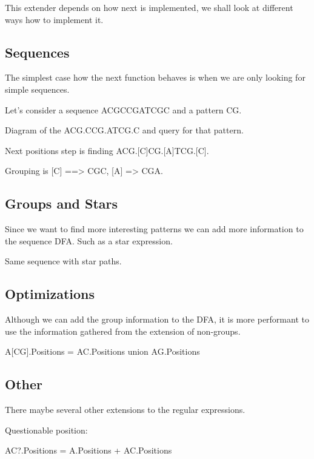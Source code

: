 This extender depends on how next is implemented, we shall look at different
ways how to implement it.

\subsection{Sequences}

The simplest case how the next function behaves is when we are only looking for simple sequences.

Let's consider a sequence ACGCCGATCGC and a pattern CG.

Diagram of the ACG.CCG.ATCG.C and query for that pattern.

Next positions step is finding ACG.[C]CG.[A]TCG.[C].

Grouping is [C] ==> CGC, [A] => CGA.

\begin{figure}[H]
	
\end{figure}

\subsection{Groups and Stars}

Since we want to find more interesting patterns we can add more
information to the sequence DFA. Such as a star expression.

Same sequence with star paths.


\subsection{Optimizations}

Although we can add the group information to the DFA, it is more
performant to use the information gathered from the extension
of non-groups.

A[CG].Positions = AC.Positions union AG.Positions


\subsection{Other}

There maybe several other extensions to the regular expressions.

Questionable position:

AC?.Positions = A.Positions + AC.Positions

